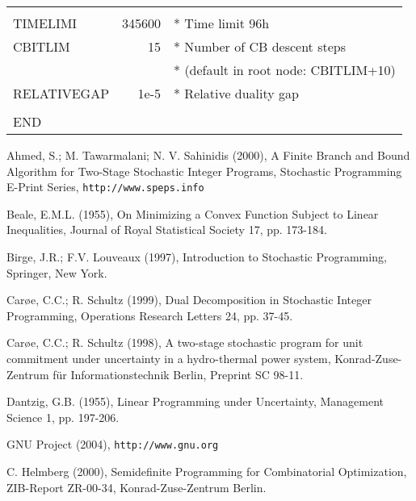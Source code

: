 \documentclass[11pt,draft]{article}
\newcommand{\+}{{\ti{+}}}
\newcommand{\1}{{\ti{1}}}
\newcommand{\etal}{et al.\/}
\begin{document}
\begin{appendix}
\begin{center}
{\begin{tabular}{lrl}
&&\\
TIMELIMI &  345600 & * Time limit 96h\\
CBITLIM       & 15 & * Number of CB descent steps\\
              &    & * {\small (default in root node: CBITLIM+10)}\\
RELATIVEGAP & 1e-5 & * Relative duality gap\\
&&\\
END&&\\
\end{tabular}}
\end{center}
\vspace{2ex}
\end{appendix}



\begin{thebibliography}{99}

\bibitem[Ahmed \etal(2000)]{ahme} Ahmed, S.; M. Tawarmalani; N. V. Sahinidis (2000), A Finite Branch and 
Bound Algorithm for Two-Stage Stochastic Integer Programs, Stochastic Programming E-Print Series,
\texttt{http://www.speps.info} 

 Beale, E.M.L. (1955), On Minimizing a Convex Function Subject to Linear
Inequalities, Journal of Royal Statistical Society 17, pp. 173-184.

 Birge, J.R.; F.V. Louveaux (1997), Introduction to
Stochastic Programming, Springer, 
    New York.

    Car\o e, C.C.; R. Schultz (1999),         
        Dual Decomposition in Sto\-chastic Integer Programming, 
        Operations Research Letters 24, pp. 37-45.

 Car\o e, C.C.; R. Schultz (1998), A two-stage stochastic program
for unit commitment under uncertainty in a hydro-thermal power system, 
Konrad-Zuse-Zentrum f\"ur Informationstechnik Berlin, Preprint SC 98-11. 

 Dantzig, G.B. (1955), Linear Programming under Uncertainty,
Management Science 1, pp. 197-206.

 GNU Project (2004), \texttt{http://www.gnu.org}

 C. Helmberg (2000), Semidefinite Programming for Combinatorial
Optimization, ZIB-Report ZR-00-34, Konrad-Zuse-Zentrum Berlin.


\end{thebibliography}
\end{document}
